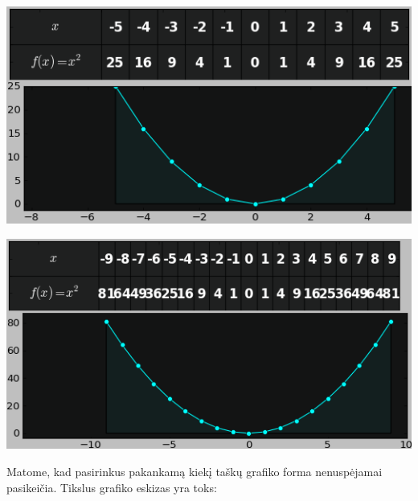\documentclass{article}
\begin{document}
\begin{minipage}[t]{0.49\textwidth}
\includegraphics[width=\textwidth]{graphsnip3.png}
\end{minipage}
\begin{minipage}[t]{0.48\textwidth}
\includegraphics[width=\textwidth]{graphsnip4.png}
\end{minipage}

Matome, kad pasirinkus pakankamą kiekį taškų grafiko forma nenuspėjamai pasikeičia. Tikslus grafiko eskizas yra toks:
\end{document}
